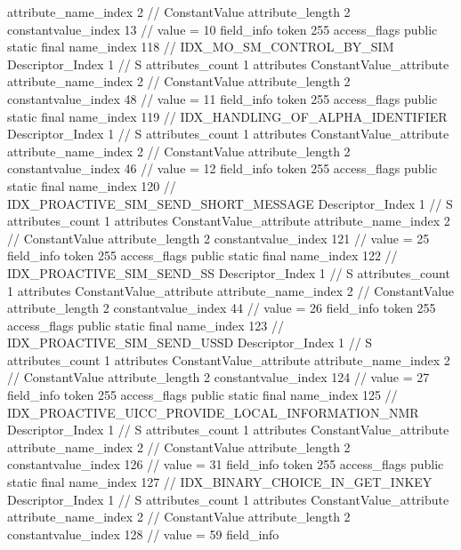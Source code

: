 {{{{{{{					attribute_name_index	2		// ConstantValue
					attribute_length	2
					constantvalue_index	13		// value = 10
				}
				}
			}
			field_info {
				token	255
				access_flags	public static final
				name_index	118		// IDX_MO_SM_CONTROL_BY_SIM
				Descriptor_Index	1		// S
				attributes_count	1
				attributes {
				ConstantValue_attribute {
					attribute_name_index	2		// ConstantValue
					attribute_length	2
					constantvalue_index	48		// value = 11
				}
				}
			}
			field_info {
				token	255
				access_flags	public static final
				name_index	119		// IDX_HANDLING_OF_ALPHA_IDENTIFIER
				Descriptor_Index	1		// S
				attributes_count	1
				attributes {
				ConstantValue_attribute {
					attribute_name_index	2		// ConstantValue
					attribute_length	2
					constantvalue_index	46		// value = 12
				}
				}
			}
			field_info {
				token	255
				access_flags	public static final
				name_index	120		// IDX_PROACTIVE_SIM_SEND_SHORT_MESSAGE
				Descriptor_Index	1		// S
				attributes_count	1
				attributes {
				ConstantValue_attribute {
					attribute_name_index	2		// ConstantValue
					attribute_length	2
					constantvalue_index	121		// value = 25
				}
				}
			}
			field_info {
				token	255
				access_flags	public static final
				name_index	122		// IDX_PROACTIVE_SIM_SEND_SS
				Descriptor_Index	1		// S
				attributes_count	1
				attributes {
				ConstantValue_attribute {
					attribute_name_index	2		// ConstantValue
					attribute_length	2
					constantvalue_index	44		// value = 26
				}
				}
			}
			field_info {
				token	255
				access_flags	public static final
				name_index	123		// IDX_PROACTIVE_SIM_SEND_USSD
				Descriptor_Index	1		// S
				attributes_count	1
				attributes {
				ConstantValue_attribute {
					attribute_name_index	2		// ConstantValue
					attribute_length	2
					constantvalue_index	124		// value = 27
				}
				}
			}
			field_info {
				token	255
				access_flags	public static final
				name_index	125		// IDX_PROACTIVE_UICC_PROVIDE_LOCAL_INFORMATION_NMR
				Descriptor_Index	1		// S
				attributes_count	1
				attributes {
				ConstantValue_attribute {
					attribute_name_index	2		// ConstantValue
					attribute_length	2
					constantvalue_index	126		// value = 31
				}
				}
			}
			field_info {
				token	255
				access_flags	public static final
				name_index	127		// IDX_BINARY_CHOICE_IN_GET_INKEY
				Descriptor_Index	1		// S
				attributes_count	1
				attributes {
				ConstantValue_attribute {
					attribute_name_index	2		// ConstantValue
					attribute_length	2
					constantvalue_index	128		// value = 59
				}
				}
			}
			field_info {
}}}}}
